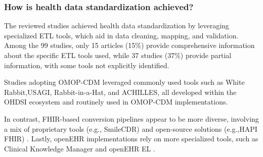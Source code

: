 \subsubsection{How is health data standardization achieved?}
\label{sec:paper1_results_standardization}

The reviewed studies achieved health data standardization by leveraging specialized ETL tools, which aid in data cleaning, mapping, and validation. Among the 99 studies, only 15 articles \cite{bennett2023mimic,espinoza_development_2023,guo_development_2023,paris_transformation_2021,bhattacharjee_inspire_2024,almeida_bicenter-ad_2022,papez_transforming_2023,almeida_two-stage_2021,biedermann_standardizing_2021,lamer_transforming_2021,papez_transforming_2021,khalid_standardized_2021,mayer_conversion_2023,delanerolle_methodological_2022,tang_creating_2023} (15\%) provide comprehensive information about the specific ETL tools used, while 37 studies \cite{li_configurable_2022,ulgu_nationwide_2024,cai_advancing_2023,chechulina_semi-automated_2023,kempf_how_2023,yu_developing_2022,de_analyzing_2021,gruendner_framework_2021,lenert_automated_2021,li_patient-screening_2021,mishra_modified_2021,tian_application_2021,xiao_development_2021,junior_integrating_2022,raventos_transforming_2023,henke_assessing_2023,kiwuwa-muyingo_enabling_2023,kohler_eos_2023,park_cancer_2023,sinaci2023data,yu_integrating_2023,bathelt_opportunities_2022,bradshaw_garde_2022,byun_analysis_2022,bialke_fhir_2022,choi_conversion_2022,phuong_extracting_2021,tan_applying_2022,almeida_methodology_2021,baumgartner_health_2024,phelan_beyond_2024,ward_omop_2024,carus_mapping_2023,oja_transforming_2023,sathappan_transformation_2021} (37\%) provide partial information, with some tools not explicitly identified.

Studies adopting OMOP-CDM leveraged commonly used tools \cite{bhattacharjee_inspire_2024,papez_transforming_2023,almeida_methodology_2021,lamer_transforming_2021,papez_transforming_2021,khalid_standardized_2021,delanerolle_methodological_2022,rosenau_generation_2022} such as White Rabbit,USAGI, Rabbit-in-a-Hat, and ACHILLES, all developed within the OHDSI ecosystem and routinely used in OMOP-CDM implementations.

In contrast, FHIR-based conversion pipelines appear to be more diverse, involving a mix of proprietary tools (e.g., SmileCDR) \cite{ulgu_nationwide_2024,lenert_automated_2021,mishra_modified_2021,sinaci2023data,bialke_fhir_2022} and open-source solutions (e.g.,HAPI FHIR) \cite{marfoglia_towards_2025,bennett2023mimic,phelan_beyond_2024}. Lastly, openEHR implementations rely on more specialized tools, such as Clinical Knowledge Manager and openEHR EL \cite{li_configurable_2022,li_patient-screening_2021,kohler_eos_2023}.

